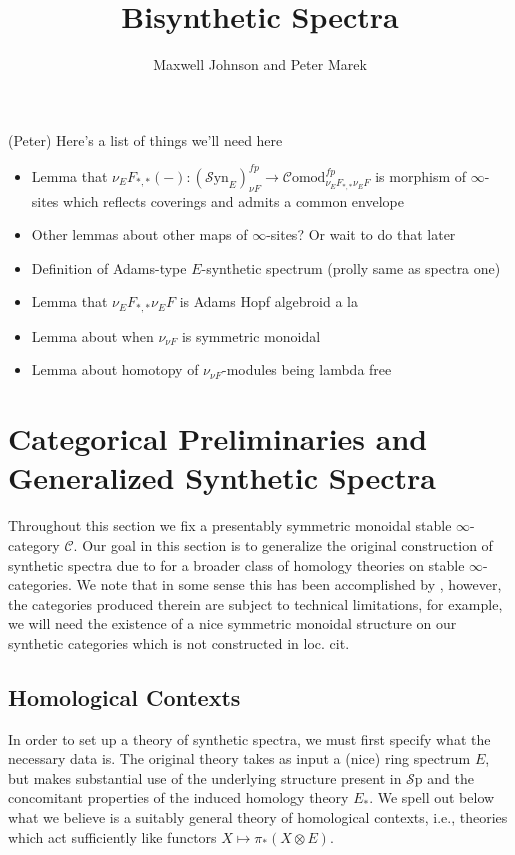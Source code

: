 \documentclass[10pt]{amsart}
\theoremstyle{definition}
\numberwithin{figure}{section}
\numberwithin{equation}{section}
\newcommand{\cC}{\mathcal{C}}
\theoremstyle{cited}
\newcommand{\Sp}{{\mathcal{S}\mathrm{p}}}
\newcommand{\Syn}{\mathcal{S}\mathrm{yn}}
\newcommand{\Comod}{\mathcal{C}\mathrm{omod}}
\begin{document}
\title{Bisynthetic Spectra}
\author{Maxwell Johnson and Peter Marek}

\maketitle

(Peter) Here's a list of things we'll need here
\begin{itemize}
    \item Lemma that $\nu_EF_{*,*}(-):(\Syn_E)_{\nu F}^{fp}\to\Comod_{\nu_EF_{*,*}\nu_EF}^{fp}$ is morphism of $\infty$-sites which reflects coverings and admits a common envelope
    \item Other lemmas about other maps of $\infty$-sites? Or wait to do that later
    \item Definition of Adams-type $E$-synthetic spectrum (prolly same as spectra one)
    \item Lemma that $\nu_EF_{*,*}\nu_EF$ is Adams Hopf algebroid a la \cite[Def. 3.1]{Pst22}
    \item Lemma about when $\nu_{\nu F}$ is symmetric monoidal
    \item Lemma about homotopy of $\nu_{\nu F}$-modules being lambda free
\end{itemize}

\section{Categorical Preliminaries and Generalized Synthetic Spectra}

Throughout this section we fix a presentably symmetric monoidal stable $\infty$-category $\cC$. Our goal in this section is to generalize the original construction of synthetic spectra due to \cite{Pst22} for a broader class of homology theories on stable $\infty$-categories. We note that in some sense this has been accomplished by \cite{todo}, however, the categories produced therein are subject to technical limitations, for example, we will need the existence of a nice symmetric monoidal structure on our synthetic categories which is not constructed in loc. cit.

\subsection{Homological Contexts} In order to set up a theory of synthetic spectra, we must first specify what the necessary data is. The original theory takes as input a (nice) ring spectrum $E$, but makes substantial use of the underlying structure present in $\Sp$ and the concomitant properties of the induced homology theory $E_*$. We spell out below what we believe is a suitably general theory of homological contexts, i.e., theories which act sufficiently like functors $X\mapsto \pi_*(X\otimes E)$.
\end{document}
